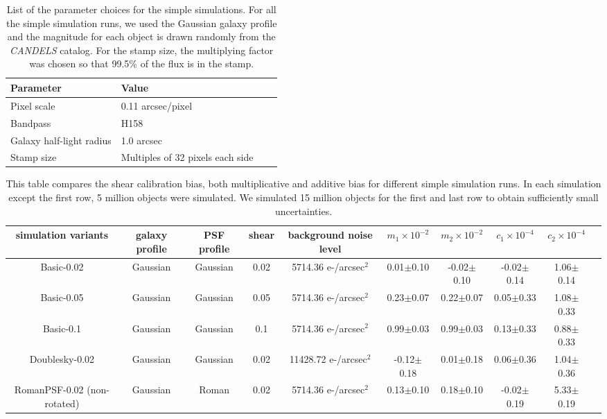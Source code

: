 \documentclass[fleqn,usenatbib]{mnras}
\begin{document}
\begin{table}
    \centering
    \begin{tabular}[width=\columnwidth]{|p{3cm}||p{3cm}|p{3cm}|p{3cm}|}
    \hline
    Parameter & Value \\
    \hline
    Pixel scale & 0.11 arcsec/pixel\\
    Bandpass & H158 \\
    Galaxy half-light radius & 1.0 arcsec\\
    Stamp size & Multiples of 32 pixels each side\\
    \hline
    \end{tabular}
    \caption{List of the parameter choices for the simple simulations. For all the simple simulation runs, we used the Gaussian galaxy profile and the magnitude for each object is drawn randomly from the \emph{CANDELS} catalog. For the stamp size, the multiplying factor was chosen so that 99.5\% of the flux is in the stamp.}
    \label{tab:params}
\end{table}

\begin{table}
	\centering
	\begin{tabular}[width=\textwidth]{ c|c|c|c|c|c|c|c|c|c } 
		\hline
		simulation variants & galaxy profile & PSF profile & shear & background noise level & $m_{1}\times10^{-2}$ & $m_{2}\times10^{-2}$ & $c_{1}\times10^{-4}$ & $c_{2}\times10^{-4}$\\
		\hline
		Basic-0.02 & Gaussian & Gaussian & 0.02 & 5714.36 e-/arcsec$^2$ & 0.01$\pm$0.10 & -0.02$\pm$0.10 & -0.02$\pm$0.14 & 1.06$\pm$0.14\\
		Basic-0.05 & Gaussian & Gaussian & 0.05 & 5714.36 e-/arcsec$^2$ & 0.23$\pm$0.07 & 0.22$\pm$0.07 & 0.05$\pm$0.33 & 1.08$\pm$0.33\\
		Basic-0.1 & Gaussian & Gaussian & 0.1 & 5714.36 e-/arcsec$^2$ & 0.99$\pm$0.03 & 0.99$\pm$0.03 & 0.13$\pm$0.33 & 0.88$\pm$0.33\\
		\hline
		Doublesky-0.02 & Gaussian & Gaussian & 0.02 & 11428.72 e-/arcsec$^2$ & -0.12$\pm$0.18 & 0.01$\pm$0.18 & 0.06$\pm$0.36 & 1.04$\pm$0.36\\
		\hline
		RomanPSF-0.02 (non-rotated) & Gaussian & Roman & 0.02 & 5714.36 e-/arcsec$^2$ & 0.13$\pm$0.10 & 0.18$\pm$0.10 & -0.02$\pm$0.19 & 5.33$\pm$0.19\\
		\hline
	\end{tabular}
	\caption{This table compares the shear calibration bias, both multiplicative and additive bias for different simple simulation runs. In each simulation except the first row, 5 million objects were simulated. We simulated 15 million objects for the first and last row to obtain sufficiently small uncertainties.}
	\label{tab:simple_sim_result}
\end{table}
\end{document}
